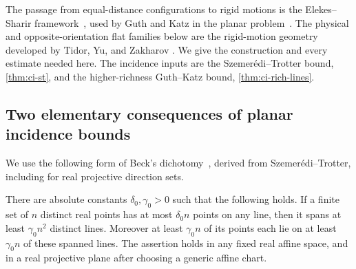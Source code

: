 The passage from equal-distance configurations to rigid motions is the Elekes--Sharir framework~\cite{elekessharir2011}, used by Guth and Katz in the planar problem~\cite{guthkatz2015}.  The physical and opposite-orientation flat families below are the rigid-motion geometry developed by Tidor, Yu, and Zakharov \cite[Section~3]{tidoryuzakharov2026}.  We give the construction and every estimate needed here.  The incidence inputs are the Szemer\'edi--Trotter bound, \cref{thm:ci-st}, and the higher-richness Guth--Katz bound, \cref{thm:ci-rich-lines}.

\subsection{Two elementary consequences of planar incidence bounds}

We use the following form of Beck's dichotomy~\cite{beck1983}, derived from Szemer\'edi--Trotter, including for real projective direction sets.

\begin{lemma}
\label{lem:mot-beck}
There are absolute constants $\delta_0,\gamma_0>0$ such that the following holds.  If a finite set of $n$ distinct real points has at most $\delta_0 n$ points on any line, then it spans at least $\gamma_0 n^2$ distinct lines.  Moreover at least $\gamma_0 n$ of its points each lie on at least $\gamma_0 n$ of these spanned lines. The assertion holds in any fixed real affine space, and in a real projective plane after choosing a generic affine chart.
\end{lemma}

